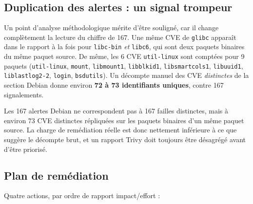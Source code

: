 \documentclass[11pt,a4paper]{report}
\begin{document}
\subsection{Duplication des alertes : un signal trompeur}

Un point d'analyse méthodologique mérite d'être souligné, car il change
complètement la lecture du chiffre de 167. Une même CVE de \texttt{glibc}
apparaît dans le rapport à la fois pour \texttt{libc-bin} \emph{et}
\texttt{libc6}, qui sont deux paquets binaires du même paquet source.
De même, les 6 CVE \texttt{util-linux} sont comptées pour 9 paquets
(\texttt{util-linux}, \texttt{mount}, \texttt{libmount1},
\texttt{libblkid1}, \texttt{libsmartcols1}, \texttt{libuuid1},
\texttt{liblastlog2-2}, \texttt{login}, \texttt{bsdutils}). Un décompte
manuel des CVE \emph{distinctes} de la section Debian donne environ
\textbf{72 à 73 identifiants uniques}, contre 167 signalements.

\begin{encadre}
Les 167 alertes Debian ne correspondent pas à 167 failles distinctes, mais à
environ 73 CVE distinctes répliquées sur les paquets binaires d'un même
paquet source. La charge de remédiation réelle est donc nettement inférieure
à ce que suggère le décompte brut, et un rapport Trivy doit toujours être
désagrégé avant d'être priorisé.
\end{encadre}

\subsection{Plan de remédiation}
\label{sec:remediation}

Quatre actions, par ordre de rapport impact/effort :
\end{document}

